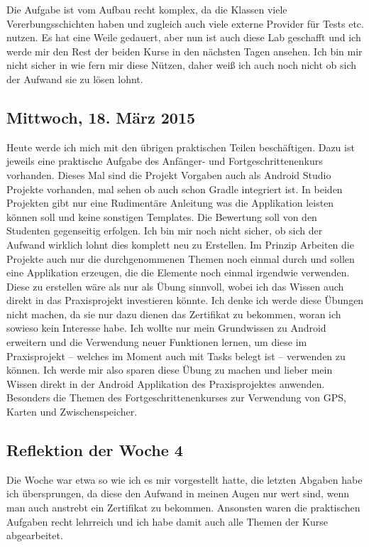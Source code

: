 \documentclass[12pt,a4paper,bibliography=totocnumbered,listof=totocnumbered]{scrartcl}
\begin{document}
Die Aufgabe ist vom Aufbau recht komplex, da die Klassen viele Vererbungsschichten haben und zugleich auch viele externe Provider für Tests etc. nutzen. Es hat eine Weile gedauert, aber nun ist auch diese Lab geschafft und ich werde mir den Rest der beiden Kurse in den nächsten Tagen ansehen. Ich bin mir nicht sicher in wie fern mir diese Nützen, daher weiß ich auch noch nicht ob sich der Aufwand sie zu lösen lohnt. 

\subsection{Mittwoch, 18. März 2015}

Heute werde ich mich mit den übrigen praktischen Teilen beschäftigen. Dazu ist jeweils eine praktische Aufgabe des Anfänger- und Fortgeschrittenenkurs vorhanden.  
Dieses Mal sind die Projekt Vorgaben auch als Android Studio Projekte vorhanden, mal sehen ob auch schon Gradle integriert ist. In beiden Projekten gibt nur eine Rudimentäre Anleitung was die Applikation leisten können soll und keine sonstigen Templates. Die Bewertung soll von den Studenten gegenseitig erfolgen. Ich bin mir noch nicht sicher, ob sich der Aufwand wirklich lohnt dies komplett neu zu Erstellen. Im Prinzip Arbeiten die Projekte auch nur die durchgenommenen Themen noch einmal durch und sollen eine Applikation erzeugen, die die Elemente noch einmal irgendwie verwenden. Diese zu erstellen wäre als nur als Übung sinnvoll, wobei ich das Wissen auch direkt in das Praxisprojekt investieren könnte. Ich denke ich werde diese Übungen nicht machen, da sie nur dazu dienen das Zertifikat zu bekommen, woran ich sowieso kein Interesse habe. Ich wollte nur mein Grundwissen zu Android erweitern und die Verwendung neuer Funktionen lernen, um diese im Praxisprojekt – welches im Moment auch mit Tasks belegt ist – verwenden zu können. Ich werde mir also sparen diese Übung zu machen und lieber mein Wissen direkt in der Android Applikation des Praxisprojektes anwenden. Besonders die Themen des Fortgeschrittenenkurses zur Verwendung von GPS, Karten und Zwischenspeicher. 

\subsection{Reflektion der Woche 4}

Die Woche war etwa so wie ich es mir vorgestellt hatte, die letzten Abgaben habe ich übersprungen, da diese den Aufwand in meinen Augen nur wert sind, wenn man auch anstrebt ein Zertifikat zu bekommen. Ansonsten waren die praktischen Aufgaben recht lehrreich und ich habe damit auch alle Themen der Kurse abgearbeitet. 
\end{document}
